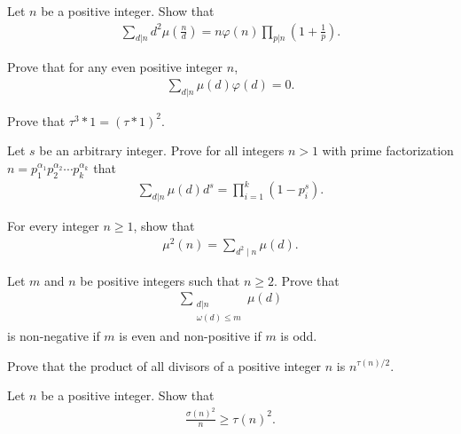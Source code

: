 \documentclass[12pt]{subfile}
\begin{document}
	\begin{problem}
		Let $n$ be a positive integer. Show that
			\begin{align*}
				\sum_{d|n} d^2 \mu\left(\frac{n}{d}\right) = n \varphi(n) \prod_{p|n} \left(1+ \frac{1}{p}\right).
			\end{align*}
	\end{problem}

	\begin{problem}
		Prove that for any even positive integer $n$,
			\begin{align*}
				\sum_{d|n} \mu(d)\varphi(d) = 0.
			\end{align*}
	\end{problem}

	\begin{problem}
		Prove that $\tau^3 \ast 1 = (\tau\ast 1)^2$.
	\end{problem}

	\begin{problem}
		Let $s$ be an arbitrary integer. Prove for all integers $n >1$ with prime factorization $n= p_1^{\alpha_1} p_2^{\alpha_2} \cdots p_k^{\alpha_k}$ that
			\begin{align*}
			\sum_{d|n} \mu (d) d^s = \prod_{i=1}^{k} (1-p_i^s).
			\end{align*}
	\end{problem}

	\begin{problem}
		For every integer $n \geq 1$, show that
			\begin{align*}
				\mu^2(n)=\sum_{d^2\mid n}\mu(d).
			\end{align*}
	\end{problem}

	\begin{problem}
		Let $m$ and $n$ be positive integers such that $n \geq 2$. Prove that
			\begin{align*}
				\sum\limits_{\substack{d|n \\ \omega(d) \leq m}} \mu(d)
			\end{align*}
		is non-negative if $m$ is even and non-positive if $m$ is odd.
	\end{problem}

	\begin{problem}
		Prove that the product of all divisors of a positive integer $n$ is $n^{\tau(n)/2}$.
	\end{problem}

	\begin{problem}
		Let $n$ be a positive integer. Show that
			\begin{align*}
				\frac{\sigma(n)^2}{n} \geq \tau(n)^2.
			\end{align*}
	\end{problem}
\end{document}
